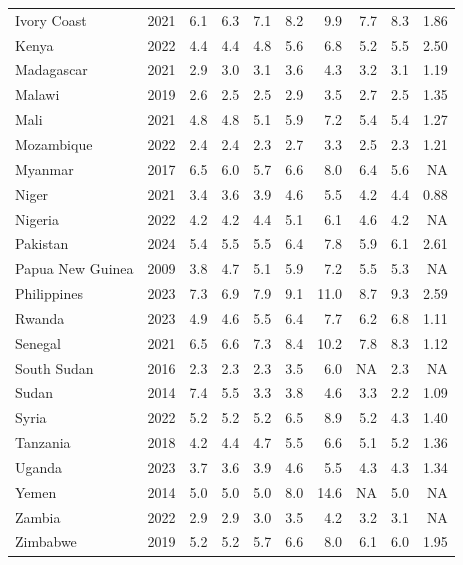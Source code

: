 \begin{table}[h]
{\begin{tabular}[t]{lrrrrrrrrr}
Ivory Coast & 2021 & 6.1 & 6.3 & 7.1 & 8.2 & 9.9 & 7.7 & 8.3 & 1.86\\
Kenya & 2022 & 4.4 & 4.4 & 4.8 & 5.6 & 6.8 & 5.2 & 5.5 & 2.50\\
Madagascar & 2021 & 2.9 & 3.0 & 3.1 & 3.6 & 4.3 & 3.2 & 3.1 & 1.19\\
Malawi & 2019 & 2.6 & 2.5 & 2.5 & 2.9 & 3.5 & 2.7 & 2.5 & 1.35\\
Mali & 2021 & 4.8 & 4.8 & 5.1 & 5.9 & 7.2 & 5.4 & 5.4 & 1.27\\
Mozambique & 2022 & 2.4 & 2.4 & 2.3 & 2.7 & 3.3 & 2.5 & 2.3 & 1.21\\
Myanmar & 2017 & 6.5 & 6.0 & 5.7 & 6.6 & 8.0 & 6.4 & 5.6 & NA\\
Niger & 2021 & 3.4 & 3.6 & 3.9 & 4.6 & 5.5 & 4.2 & 4.4 & 0.88\\
Nigeria & 2022 & 4.2 & 4.2 & 4.4 & 5.1 & 6.1 & 4.6 & 4.2 & NA\\
Pakistan & 2024 & 5.4 & 5.5 & 5.5 & 6.4 & 7.8 & 5.9 & 6.1 & 2.61\\
Papua New Guinea & 2009 & 3.8 & 4.7 & 5.1 & 5.9 & 7.2 & 5.5 & 5.3 & NA\\
Philippines & 2023 & 7.3 & 6.9 & 7.9 & 9.1 & 11.0 & 8.7 & 9.3 & 2.59\\
Rwanda & 2023 & 4.9 & 4.6 & 5.5 & 6.4 & 7.7 & 6.2 & 6.8 & 1.11\\
Senegal & 2021 & 6.5 & 6.6 & 7.3 & 8.4 & 10.2 & 7.8 & 8.3 & 1.12\\
South Sudan & 2016 & 2.3 & 2.3 & 2.3 & 3.5 & 6.0 & NA & 2.3 & NA\\
Sudan & 2014 & 7.4 & 5.5 & 3.3 & 3.8 & 4.6 & 3.3 & 2.2 & 1.09\\
Syria & 2022 & 5.2 & 5.2 & 5.2 & 6.5 & 8.9 & 5.2 & 4.3 & 1.40\\
Tanzania & 2018 & 4.2 & 4.4 & 4.7 & 5.5 & 6.6 & 5.1 & 5.2 & 1.36\\
Uganda & 2023 & 3.7 & 3.6 & 3.9 & 4.6 & 5.5 & 4.3 & 4.3 & 1.34\\
Yemen & 2014 & 5.0 & 5.0 & 5.0 & 8.0 & 14.6 & NA & 5.0 & NA\\
Zambia & 2022 & 2.9 & 2.9 & 3.0 & 3.5 & 4.2 & 3.2 & 3.1 & NA\\
Zimbabwe & 2019 & 5.2 & 5.2 & 5.7 & 6.6 & 8.0 & 6.1 & 6.0 & 1.95\\
\bottomrule
\end{tabular}}
\end{table}